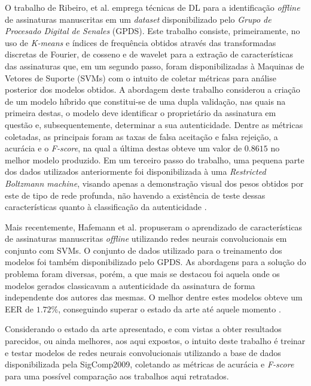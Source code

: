 O trabalho de Ribeiro, et al. emprega técnicas de DL para a identificação \emph{offline} de assinaturas manuscritas em um \emph{dataset} disponibilizado pelo \emph{Grupo de Procesado Digital de Senales} (GPDS). Este trabalho consiste, primeiramente, no uso de \emph{K-means} e índices de frequência obtidos através das transformadas discretas de Fourier, de cosseno e de wavelet para a extração de características das assinaturas que, em um segundo passo, foram disponibilizadas à Maquinas de Vetores de Suporte (SVMs) com o intuito de coletar métricas para análise posterior dos modelos obtidos. A abordagem deste trabalho considerou a criação de um modelo híbrido que constitui-se de uma dupla validação, nas quais na primeira destas, o modelo deve identificar o proprietário da assinatura em questão e, subsequentemente, determinar a sua autenticidade. Dentre as métricas coletadas, as principais foram as taxas de falsa aceitação e falsa rejeição, a acurácia e o \emph{F-score}, na qual a última destas obteve um valor de $0.8615$ no melhor modelo produzido. Em um terceiro passo do trabalho, uma pequena parte dos dados utilizados anteriormente foi disponibilizada à uma \emph{Restricted Boltzmann machine}, visando apenas a demonstração visual dos pesos obtidos por este de tipo de rede profunda, não havendo a existência de teste dessas características quanto à classificação da autenticidade \cite{ribeiro2011}.

Mais recentemente, Hafemann et al. propuseram o aprendizado de características de assinaturas manuscritas \emph{offline} utilizando redes neurais convolucionais em conjunto com SVMs. O conjunto de dados utilizado para o treinamento dos modelos foi também disponibilizado pelo GPDS. As abordagens para a solução do problema foram diversas, porém, a que mais se destacou foi aquela onde os modelos gerados classicavam a autenticidade da assinatura de forma independente dos autores das mesmas. O melhor dentre estes modelos obteve um EER de $1.72\%$, conseguindo superar o estado da arte até aquele momento \cite{hafemann2016}.

Considerando o estado da arte apresentado, e com vistas a obter resultados parecidos, ou ainda melhores, aos aqui expostos, o intuito deste trabalho é treinar e testar modelos de redes neurais convolucionais utilizando a base de dados disponibilizada pela SigComp2009, coletando as métricas de acurácia e \emph{F-score} para uma possível comparação aos trabalhos aqui retratados.
